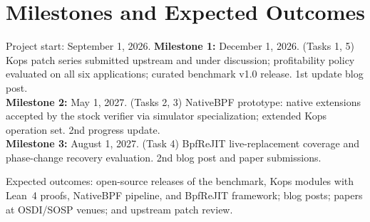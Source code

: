 \section{Milestones and Expected Outcomes}

\noindent Project start: September 1, 2026.
\textbf{Milestone 1:} December 1, 2026. (Tasks 1, 5) Kops patch series submitted upstream and under discussion; profitability policy evaluated on all six applications; curated benchmark v1.0 release. 1st update blog post.\\
\textbf{Milestone 2:} May 1, 2027. (Tasks 2, 3) NativeBPF prototype: native extensions accepted by the stock verifier via simulator specialization; extended Kops operation set. 2nd progress update.\\
\textbf{Milestone 3:} August 1, 2027. (Task 4) BpfReJIT live-replacement coverage and phase-change recovery evaluation. 2nd blog post and paper submissions.

Expected outcomes: open-source releases of the benchmark, Kops modules with Lean~4 proofs, NativeBPF pipeline, and BpfReJIT framework; blog posts; papers at OSDI/SOSP venues; and upstream patch review.
